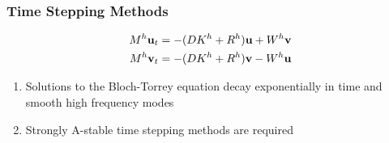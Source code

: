 \begin{frame}
\frametitle{Time Stepping Methods}
\begin{align*}
        M^h \mathbf{u}_t &= -(D K^h + R^h) \mathbf{u} + W^h \mathbf{v}\\
        M^h \mathbf{v}_t &= -(D K^h + R^h) \mathbf{v} - W^h \mathbf{u}
\end{align*}
\vspace{-0.5cm}
\begin{enumerate}
    \item Solutions to the Bloch-Torrey equation decay exponentially in time and smooth high frequency modes
    \pause
    \item Strongly A-stable time stepping methods are required %
\end{enumerate}
\end{frame}


